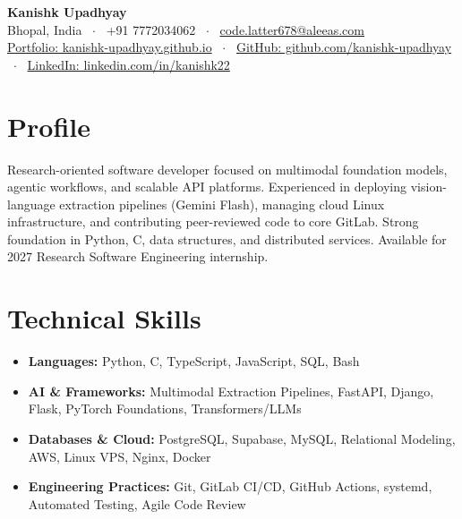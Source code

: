 \documentclass[10pt,a4paper]{article}
\begin{document}
\begin{center}
    {\huge \textbf{Kanishk Upadhyay}} \\ \vspace{2pt}
    Bhopal, India \ $\cdot$ \ +91 7772034062 \ $\cdot$ \ \href{mailto:code.latter678@aleeas.com}{code.latter678@aleeas.com} \\ \vspace{2pt}
    \href{https://kanishk-upadhyay.github.io/}{Portfolio: kanishk-upadhyay.github.io} \ $\cdot$ \ 
    \href{https://github.com/kanishk-upadhyay}{GitHub: github.com/kanishk-upadhyay} \ $\cdot$ \ 
    \href{https://linkedin.com/in/kanishk22}{LinkedIn: linkedin.com/in/kanishk22}
\end{center}

\vspace{-6pt}
\section{Profile}
Research-oriented software developer focused on multimodal foundation models, agentic workflows, and scalable API platforms. Experienced in deploying vision-language extraction pipelines (Gemini Flash), managing cloud Linux infrastructure, and contributing peer-reviewed code to core GitLab. Strong foundation in Python, C, data structures, and distributed services. Available for 2027 Research Software Engineering internship.

\section{Technical Skills}
\begin{itemize}
    \item \textbf{Languages:} Python, C, TypeScript, JavaScript, SQL, Bash
    \item \textbf{AI \& Frameworks:} Multimodal Extraction Pipelines, FastAPI, Django, Flask, PyTorch Foundations, Transformers/LLMs
    \item \textbf{Databases \& Cloud:} PostgreSQL, Supabase, MySQL, Relational Modeling, AWS, Linux VPS, Nginx, Docker
    \item \textbf{Engineering Practices:} Git, GitLab CI/CD, GitHub Actions, systemd, Automated Testing, Agile Code Review
\end{itemize}
\end{document}
